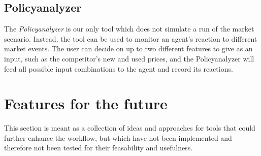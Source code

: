 \subsection*{Policyanalyzer}

The \emph{Policyanalyzer} is our only tool which does not simulate a run of the market scenario. Instead, the tool can be used to monitor an agent's reaction to different market events. The user can decide on up to two different features to give as an input, such as the competitor's new and used prices, and the Policyanalyzer will feed all possible input combinations to the agent and record its reactions. 

\section{Features for the future}

This section is meant as a collection of ideas and approaches for tools that could further enhance the workflow, but which have not been implemented and therefore not been tested for their feasability and usefulness.
